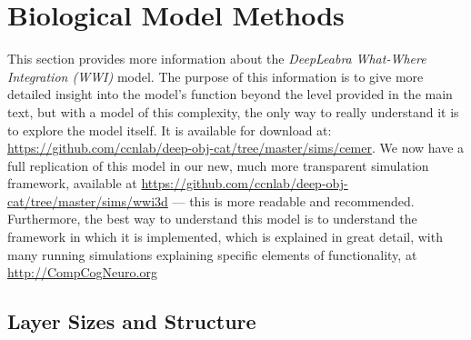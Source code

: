\section{Biological Model Methods}

This section provides more information about the {\em DeepLeabra} {\em What-Where Integration (WWI)} model.  The purpose of this information is to give more detailed insight into the model's function beyond the level provided in the main text, but with a model of this complexity, the only way to really understand it is to explore the model itself.  It is available for download at: \url{https://github.com/ccnlab/deep-obj-cat/tree/master/sims/cemer}.  We now have a full replication of this model in our new, much more transparent simulation framework, available at \url{https://github.com/ccnlab/deep-obj-cat/tree/master/sims/wwi3d} --- this is more readable and recommended.  Furthermore, the best way to understand this model is to understand the framework in which it is implemented, which is explained in great detail, with many running simulations explaining specific elements of functionality, at \url{http://CompCogNeuro.org}

\subsection{Layer Sizes and Structure}

